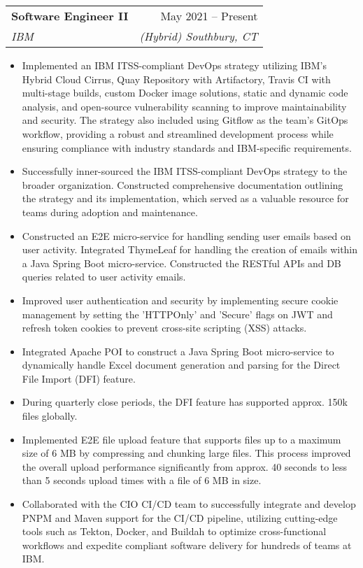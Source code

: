 \documentclass[letterpaper,11pt]{article}
\makeatletter
\newcommand{\resumeItem}[1]{
  \item[-] \small{
    {#1 \vspace{-2pt}}
  }
}
\newcommand{\resumeSubheading}[4]{
  \vspace{-2pt}\item
    \begin{tabular*}{0.97\textwidth}[t]{l@{\extracolsep{\fill}}r}
      \textbf{#1} & #2 \\
      \textit{\small#3} & \textit{\small #4} \\
    \end{tabular*}\vspace{-7pt}
}
\newcommand{\resumeItemListStart}{\begin{itemize}[rightmargin=\dimexpr\linewidth-17.25cm-\leftmargin\relax]}
\newcommand{\resumeItemListEnd}{\end{itemize}\vspace{-5pt}}
\makeatother
\begin{document}
\resumeSubheading
{Software Engineer II}{May 2021 – Present}
{IBM}{(Hybrid) Southbury, CT}
\resumeItemListStart
\resumeItem{Implemented an IBM ITSS-compliant DevOps strategy utilizing IBM's Hybrid Cloud Cirrus, Quay Repository with Artifactory, Travis CI with multi-stage builds, custom Docker image solutions, static and dynamic code analysis, and open-source vulnerability scanning to improve maintainability and security. The strategy also included using Gitflow as the team's GitOps workflow, providing a robust and streamlined development process while ensuring compliance with industry standards and IBM-specific requirements.}
\resumeItem{Successfully inner-sourced the IBM ITSS-compliant DevOps strategy to the broader organization. Constructed comprehensive documentation outlining the strategy and its implementation, which served as a valuable resource for teams during adoption and maintenance.}
\resumeItem{Constructed an E2E micro-service for handling sending user emails based on user activity. Integrated ThymeLeaf for handling the creation of emails within a Java Spring Boot micro-service. Constructed the RESTful APIs and DB queries related to user activity emails.}
\resumeItem{Improved user authentication and security by implementing secure cookie management by setting the 'HTTPOnly' and 'Secure' flags on JWT and refresh token cookies to prevent cross-site scripting (XSS) attacks.}
\resumeItem{Integrated Apache POI to construct a Java Spring Boot micro-service to dynamically handle Excel document generation and parsing for the Direct File Import (DFI) feature.}
\resumeItem{During quarterly close periods, the DFI feature has supported approx. 150k files globally.}
\resumeItem{Implemented E2E file upload feature that supports files up to a maximum size of 6 MB by compressing and chunking large files. This process improved the overall upload performance significantly from approx. 40 seconds to less than 5 seconds upload times with a file of 6 MB in size.}
\resumeItem{Collaborated with the CIO CI/CD team to successfully integrate and develop PNPM and Maven support for the CI/CD pipeline, utilizing cutting-edge tools such as Tekton, Docker, and Buildah to optimize cross-functional workflows and expedite compliant software delivery for hundreds of teams at IBM.}
\resumeItemListEnd
\end{document}
